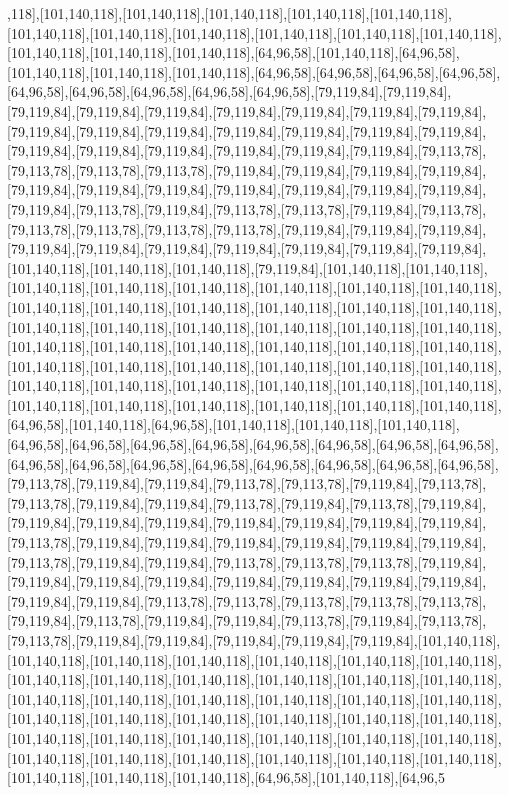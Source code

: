 ,118],[101,140,118],[101,140,118],[101,140,118],[101,140,118],[101,140,118],[101,140,118],[101,140,118],[101,140,118],[101,140,118],[101,140,118],[101,140,118],[101,140,118],[101,140,118],[101,140,118],[64,96,58],[101,140,118],[64,96,58],[101,140,118],[101,140,118],[101,140,118],[64,96,58],[64,96,58],[64,96,58],[64,96,58],[64,96,58],[64,96,58],[64,96,58],[64,96,58],[64,96,58],[79,119,84],[79,119,84],[79,119,84],[79,119,84],[79,119,84],[79,119,84],[79,119,84],[79,119,84],[79,119,84],[79,119,84],[79,119,84],[79,119,84],[79,119,84],[79,119,84],[79,119,84],[79,119,84],[79,119,84],[79,119,84],[79,119,84],[79,119,84],[79,119,84],[79,119,84],[79,113,78],[79,113,78],[79,113,78],[79,113,78],[79,119,84],[79,119,84],[79,119,84],[79,119,84],[79,119,84],[79,119,84],[79,119,84],[79,119,84],[79,119,84],[79,119,84],[79,119,84],[79,119,84],[79,113,78],[79,119,84],[79,113,78],[79,113,78],[79,119,84],[79,113,78],[79,113,78],[79,113,78],[79,113,78],[79,113,78],[79,119,84],[79,119,84],[79,119,84],[79,119,84],[79,119,84],[79,119,84],[79,119,84],[79,119,84],[79,119,84],[79,119,84],[101,140,118],[101,140,118],[101,140,118],[79,119,84],[101,140,118],[101,140,118],[101,140,118],[101,140,118],[101,140,118],[101,140,118],[101,140,118],[101,140,118],[101,140,118],[101,140,118],[101,140,118],[101,140,118],[101,140,118],[101,140,118],[101,140,118],[101,140,118],[101,140,118],[101,140,118],[101,140,118],[101,140,118],[101,140,118],[101,140,118],[101,140,118],[101,140,118],[101,140,118],[101,140,118],[101,140,118],[101,140,118],[101,140,118],[101,140,118],[101,140,118],[101,140,118],[101,140,118],[101,140,118],[101,140,118],[101,140,118],[101,140,118],[101,140,118],[101,140,118],[101,140,118],[101,140,118],[101,140,118],[101,140,118],[101,140,118],[64,96,58],[101,140,118],[64,96,58],[101,140,118],[101,140,118],[101,140,118],[64,96,58],[64,96,58],[64,96,58],[64,96,58],[64,96,58],[64,96,58],[64,96,58],[64,96,58],[64,96,58],[64,96,58],[64,96,58],[64,96,58],[64,96,58],[64,96,58],[64,96,58],[64,96,58],[79,113,78],[79,119,84],[79,119,84],[79,113,78],[79,113,78],[79,119,84],[79,113,78],[79,113,78],[79,119,84],[79,119,84],[79,113,78],[79,119,84],[79,113,78],[79,119,84],[79,119,84],[79,119,84],[79,119,84],[79,119,84],[79,119,84],[79,119,84],[79,119,84],[79,113,78],[79,119,84],[79,119,84],[79,119,84],[79,119,84],[79,119,84],[79,119,84],[79,113,78],[79,119,84],[79,119,84],[79,113,78],[79,113,78],[79,113,78],[79,119,84],[79,119,84],[79,119,84],[79,119,84],[79,119,84],[79,119,84],[79,119,84],[79,119,84],[79,119,84],[79,119,84],[79,113,78],[79,113,78],[79,113,78],[79,113,78],[79,113,78],[79,119,84],[79,113,78],[79,119,84],[79,119,84],[79,113,78],[79,119,84],[79,113,78],[79,113,78],[79,119,84],[79,119,84],[79,119,84],[79,119,84],[79,119,84],[101,140,118],[101,140,118],[101,140,118],[101,140,118],[101,140,118],[101,140,118],[101,140,118],[101,140,118],[101,140,118],[101,140,118],[101,140,118],[101,140,118],[101,140,118],[101,140,118],[101,140,118],[101,140,118],[101,140,118],[101,140,118],[101,140,118],[101,140,118],[101,140,118],[101,140,118],[101,140,118],[101,140,118],[101,140,118],[101,140,118],[101,140,118],[101,140,118],[101,140,118],[101,140,118],[101,140,118],[101,140,118],[101,140,118],[101,140,118],[101,140,118],[101,140,118],[101,140,118],[101,140,118],[101,140,118],[101,140,118],[64,96,58],[101,140,118],[64,96,5